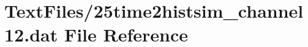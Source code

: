 \hypertarget{25time2histsim__channel12_8dat}{}\section{Text\+Files/25time2histsim\+\_\+channel12.dat File Reference}
\label{25time2histsim__channel12_8dat}
